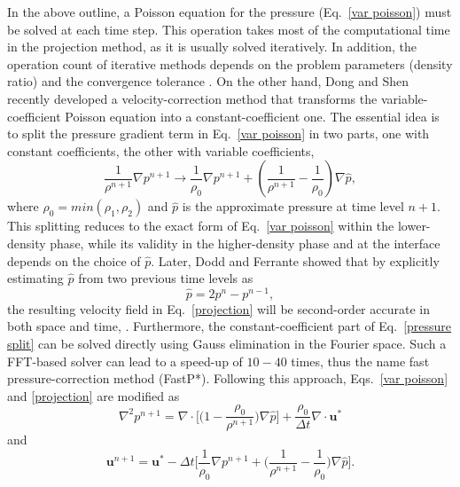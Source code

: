 In the above outline, a Poisson equation for the pressure (Eq.\ \eqref{var poisson}) must be solved at each time step. This operation takes most of the computational time in the projection method, as it is usually solved iteratively. In addition, the operation count of iterative methods depends on the problem parameters (\eg density ratio) and the convergence tolerance \cite{Dodd_JCP_2014}. On the other hand, Dong and Shen \cite{Dong_JCP_2012} recently developed a velocity-correction method that transforms the variable-coefficient Poisson equation into a constant-coefficient one. The essential idea is to split the pressure gradient term in Eq.\ \eqref{var poisson} in two parts, one with constant coefficients, the other with variable coefficients, \ie
\begin{equation}
    \frac{1}{\rho^{n+1}} \nabla p^{n+1} \rightarrow \frac{1}{\rho_0} \nabla p^{n+1} + ( \frac{1}{\rho^{n+1}} - \frac{1}{\rho_0} ) \nabla \hat{p},
  \label{pressure split}
\end{equation}
where $\rho_0=min(\rho_1,\rho_2)$ and $\hat{p}$ is the approximate pressure at time level $n+1$. This splitting reduces to the exact form of Eq.\ \eqref{var poisson} within the lower-density phase, while its validity in the higher-density phase and at the interface depends on the choice of $\hat{p}$. Later, Dodd and Ferrante \cite{Dodd_JCP_2014} showed that by explicitly estimating $\hat{p}$ from two previous time levels as
\begin{equation}
    \hat{p} = 2p^{n}-p^{n-1},
  \label{pressure approx}
\end{equation}
the resulting velocity field in Eq.\ \eqref{projection} will be second-order accurate in both space and time, %
.
Furthermore, %
the constant-coefficient part of Eq.\ \eqref{pressure split} can be solved directly using Gauss elimination in the Fourier space. Such a FFT-based solver can lead to a speed-up of $10-40$ times, thus the name fast pressure-correction method (FastP*). Following this approach, Eqs.\ \eqref{var poisson} and \eqref{projection} are modified as
\begin{equation}
  \nabla^2 p^{n+1} = \nabla \cdot \bigg[ \big(1-\frac{\rho_0}{\rho^{n+1}}) \nabla \hat{p} \bigg] +  \frac{\rho_0}{\Delta t}\nabla \cdot {\bm u}^*
  \label{poisson split}
\end{equation}
\noindent and
\begin{equation}
    {\bm u}^{n+1} = {\bm u}^* -\Delta t \bigg[\frac{1}{\rho_0} \nabla p^{n+1} + \big(\frac{1}{\rho^{n+1}} - \frac{1}{\rho_0}\big)\nabla \hat{p} \bigg].
  \label{projection 1}
\end{equation}


